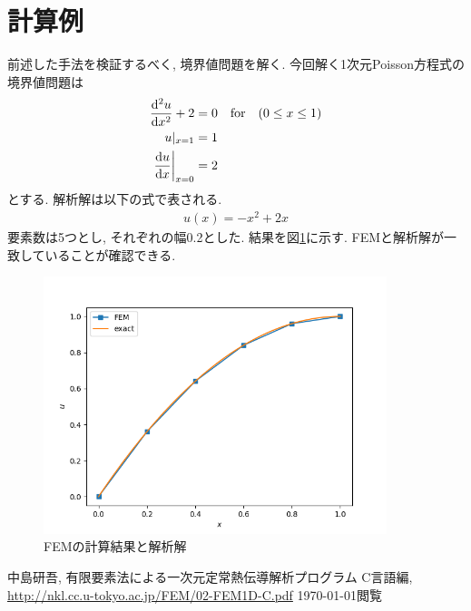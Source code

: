 \documentclass[paper=a4]{jlreq}
\begin{document}
\section{計算例}
前述した手法を検証するべく, 境界値問題を解く.
今回解く1次元Poisson方程式の境界値問題は
\begin{align}
    \begin{aligned}
        \dv[2]{u}{x}       + 2 & = 0 \quad \mathrm{for}\quad (0 \leq x \leq 1) \\
        u|_{x=1}               & = 1                                        \\
        \eval{\dv{u}{x}}_{x=0} & = 2
    \end{aligned}
    \label{eq:poisson_example}
\end{align}
とする. 解析解は以下の式で表される.
\begin{align}
    u(x) = -x^2+2x
\end{align}
要素数は5つとし, それぞれの幅0.2とした. 
結果を図\ref{fig:result}に示す. FEMと解析解が一致していることが確認できる.
\begin{figure}[htbp]
    \centering
    \includegraphics[width=10cm]{5-elements.png}
    \caption{FEMの計算結果と解析解}
    \label{fig:result}
\end{figure}

\begin{thebibliography}{9}
    中島研吾,
    有限要素法による一次元定常熱伝導解析プログラム C言語編,
    \url{http://nkl.cc.u-tokyo.ac.jp/FEM/02-FEM1D-C.pdf} \today 閲覧
\end{thebibliography}
\end{document}
